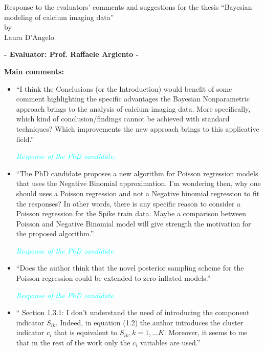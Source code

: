 \documentclass[11pt]{letter}
\begin{document}
\begin{center}
	{\large \sc Response to the evaluators' comments and suggestions for the thesis} \newline ``Bayesian modeling of calcium imaging data'' \\
	{\sc by} \\
	Laura D'Angelo
	\vspace*{1cm}
\end{center}

\begin{center}
{\large\bf - Evaluator: Prof. Raffaele Argiento -}
\end{center}

{\bf Main comments:}
%
\begin{itemize}
	
%
\item ``I think the Conclusions (or the Introduction) would benefit of some comment highlighting the specific advantages the Bayesian Nonparametric approach brings to the analysis of calcium imaging data. More specifically, which kind of conclusion/findings cannot be achieved with standard techniques? Which
improvements the new approach brings to this applicative field.''\vskip1mm

{\em 
	\textcolor{cyan}{Response of the PhD candidate.}
	}
\vskip3mm

%
\item ``The PhD candidate proposes a new algorithm for Poisson regression models that uses the Negative Binomial approximation. I'm wondering then, why one should uses a Poisson regression and not a Negative binomial regression to fit the responses?
In other words, there is any specific reason to consider a Poisson regression for the Spike train data. Maybe a comparison between Poisson and Negative Binomial model will give strength the motivation for the proposed algorithm.''
\vskip1mm

{\em 
	\textcolor{cyan}{Response of the PhD candidate.}
}
\vskip3mm

%
\item ``Does the author think that the novel posterior sampling scheme for the Poisson regression could be extended to zero-inflated models.''\vskip1mm

{\em 
	\textcolor{cyan}{Response of the PhD candidate.}
}
\vskip3mm

%
\item `` Section 1.3.1: 
I don't understand the need of introducing the component indicator $S_{ik}$. Indeed, in equation (1.2) the author introduces the cluster indicator $c_i$ that is equivalent to ${S_{ik},k=1,...K}$. Moreover, it seems to me that in the rest of the work only the $c_i$ variables are used.''
\vskip1mm


\end{itemize}
\end{document}
